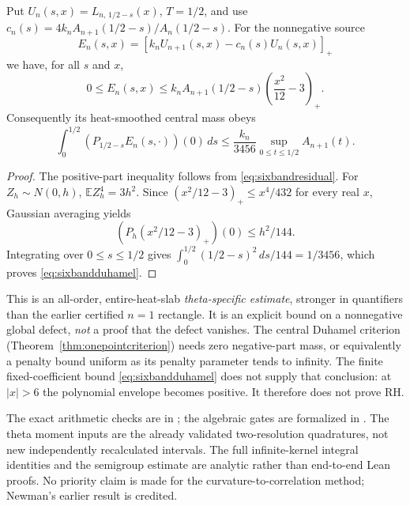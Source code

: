 \begin{corollary}
\label{cor:sixbandduhamel}
Put $U_n(s,x)=L_{n,\,1/2-s}(x)$,
$T=1/2$, and use
$c_n(s)=4k_nA_{n+1}(1/2-s)/A_n(1/2-s)$.
For the nonnegative source
\[
E_n(s,x)=[k_nU_{n+1}(s,x)-c_n(s)U_n(s,x)]_+
\]
we have, for all $s$ and $x$,
\begin{equation}
0\le E_n(s,x)\le
k_nA_{n+1}(1/2-s)
\left(\frac{x^2}{12}-3\right)_+ .
\end{equation}
Consequently its heat-smoothed central mass obeys
\begin{equation}\label{eq:sixbandduhamel}
\boxed{
\int_0^{1/2}(P_{1/2-s}E_n(s,\cdot))(0)\,ds
\le\frac{k_n}{3456}
\sup_{0\le t\le1/2}A_{n+1}(t).
}
\end{equation}
\end{corollary}
\begin{proof}
The positive-part inequality follows from
\eqref{eq:sixbandresidual}.
For $Z_h\sim N(0,h)$, $\mathbb E Z_h^4=3h^2$.
Since
$(x^2/12-3)_+\le x^4/432$
for every real $x$, Gaussian averaging yields
\[
\left(P_h(x^2/12-3)_+\right)(0)
\le h^2/144.
\]
Integrating over $0\le s\le1/2$ gives
$\int_0^{1/2}(1/2-s)^2\,ds/144=1/3456$,
which proves \eqref{eq:sixbandduhamel}.
\end{proof}

This is an all-order, entire-heat-slab
\emph{theta-specific estimate}, stronger in
quantifiers than the earlier certified $n=1$
rectangle. It is an explicit bound
on a nonnegative global defect, \emph{not}
a proof that the defect vanishes.
The central Duhamel criterion
(Theorem~\ref{thm:onepointcriterion}) needs
zero negative-part mass, or equivalently
a penalty bound uniform as its penalty
parameter tends to infinity.
The finite fixed-coefficient bound
\eqref{eq:sixbandduhamel} does not
supply that conclusion: at $|x|>6$
the polynomial envelope becomes positive.
It therefore does not prove RH.

The exact arithmetic checks are in
;
the algebraic gates are formalized in
.
The theta moment inputs are the already
validated two-resolution quadratures,
not new independently recalculated intervals.
The full infinite-kernel integral
identities and the semigroup estimate
are analytic rather than end-to-end Lean proofs.
No priority claim is made for the
curvature-to-correlation method;
Newman's earlier result is credited.
